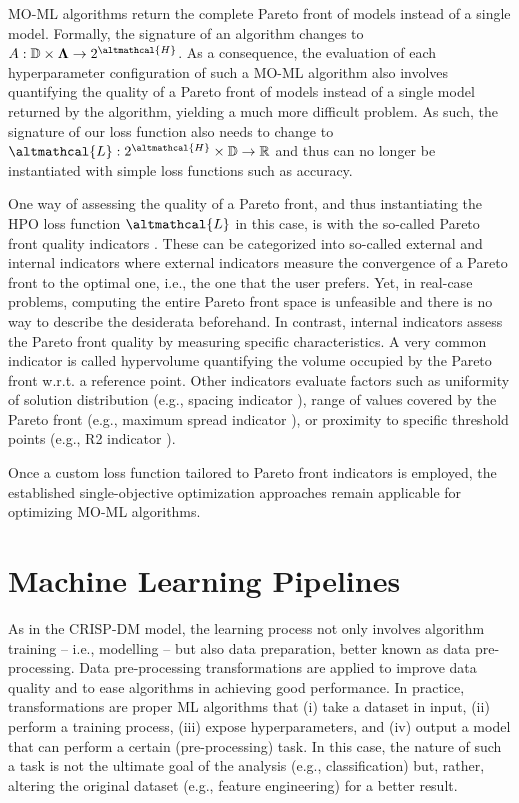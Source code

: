 MO-ML algorithms return the complete Pareto front of models instead of a single model.
Formally, the signature of an algorithm changes to $A: \mathbb{D} \times \vec{\Lambda} \rightarrow 2^{\altmathcal{H}}$. As a consequence, the evaluation of each hyperparameter configuration of such a MO-ML algorithm also involves quantifying the quality of a Pareto front of models instead of a single model returned by the algorithm, yielding a much more difficult problem.
As such, the signature of our loss function also needs to change to $\altmathcal{L}: 2^{\altmathcal{H}} \times \mathbb{D} \rightarrow \mathbb{R}$ and thus can no longer be instantiated with simple loss functions such as accuracy.

One way of assessing the quality of a Pareto front, and thus instantiating the HPO loss function $\altmathcal{L}$ in this case, is with the so-called Pareto front quality indicators \cite{audet-ejor21}.
These can be categorized into so-called external and internal indicators where external indicators measure the convergence of a Pareto front to the optimal one, i.e., the one that the user prefers.
Yet, in real-case problems, computing the entire Pareto front space is unfeasible and there is no way to describe the desiderata beforehand.
In contrast, internal indicators assess the Pareto front quality by measuring specific characteristics.
A very common indicator is called hypervolume \cite{zitzler1999multiobjective} quantifying the volume occupied by the Pareto front w.r.t. a reference point.
Other indicators evaluate factors such as uniformity of solution distribution (e.g., spacing indicator \cite{schott1995fault}), range of values covered by the Pareto front (e.g., maximum spread indicator \cite{zitzler2000comparison}), or proximity to specific threshold points (e.g., R2 indicator \cite{hansen1994evaluating}).

Once a custom loss function tailored to Pareto front indicators is employed, the established single-objective optimization approaches remain applicable for optimizing MO-ML algorithms.


\section{Machine Learning Pipelines}
\label{automl-background-sec:pipelines}

As in the CRISP-DM model, the learning process not only involves algorithm training -- i.e., modelling -- but also data preparation, better known as data pre-processing.
Data pre-processing transformations are applied to improve data quality and to ease algorithms in achieving good performance.
In practice, transformations are proper ML algorithms that (i) take a dataset in input, (ii) perform a training process, (iii) expose hyperparameters, and (iv) output a model that can perform a certain (pre-processing) task.
In this case, the nature of such a task is not the ultimate goal of the analysis (e.g., classification) but, rather, altering the original dataset (e.g., feature engineering) for a better result.

